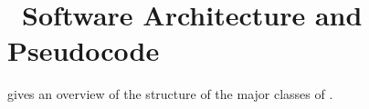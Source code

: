 \section{\EASAL\ Software Architecture and Pseudocode}
\label{sec:architecture}

 gives an overview of the structure of the
major classes of \EASAL.


